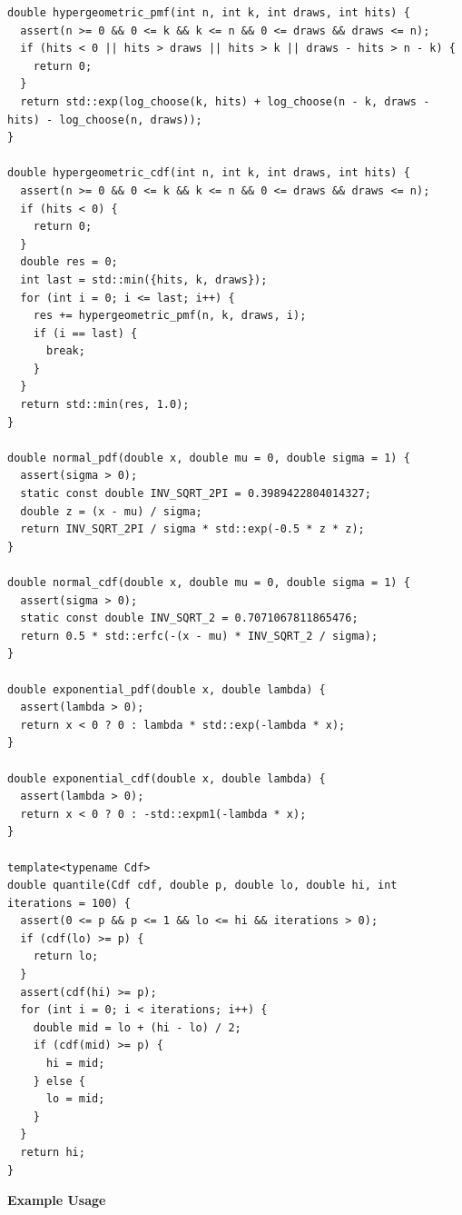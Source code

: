 \begin{lstlisting}[style=cpp]
double hypergeometric_pmf(int n, int k, int draws, int hits) {
  assert(n >= 0 && 0 <= k && k <= n && 0 <= draws && draws <= n);
  if (hits < 0 || hits > draws || hits > k || draws - hits > n - k) {
    return 0;
  }
  return std::exp(log_choose(k, hits) + log_choose(n - k, draws - hits) - log_choose(n, draws));
}

double hypergeometric_cdf(int n, int k, int draws, int hits) {
  assert(n >= 0 && 0 <= k && k <= n && 0 <= draws && draws <= n);
  if (hits < 0) {
    return 0;
  }
  double res = 0;
  int last = std::min({hits, k, draws});
  for (int i = 0; i <= last; i++) {
    res += hypergeometric_pmf(n, k, draws, i);
    if (i == last) {
      break;
    }
  }
  return std::min(res, 1.0);
}

double normal_pdf(double x, double mu = 0, double sigma = 1) {
  assert(sigma > 0);
  static const double INV_SQRT_2PI = 0.3989422804014327;
  double z = (x - mu) / sigma;
  return INV_SQRT_2PI / sigma * std::exp(-0.5 * z * z);
}

double normal_cdf(double x, double mu = 0, double sigma = 1) {
  assert(sigma > 0);
  static const double INV_SQRT_2 = 0.7071067811865476;
  return 0.5 * std::erfc(-(x - mu) * INV_SQRT_2 / sigma);
}

double exponential_pdf(double x, double lambda) {
  assert(lambda > 0);
  return x < 0 ? 0 : lambda * std::exp(-lambda * x);
}

double exponential_cdf(double x, double lambda) {
  assert(lambda > 0);
  return x < 0 ? 0 : -std::expm1(-lambda * x);
}

template<typename Cdf>
double quantile(Cdf cdf, double p, double lo, double hi, int iterations = 100) {
  assert(0 <= p && p <= 1 && lo <= hi && iterations > 0);
  if (cdf(lo) >= p) {
    return lo;
  }
  assert(cdf(hi) >= p);
  for (int i = 0; i < iterations; i++) {
    double mid = lo + (hi - lo) / 2;
    if (cdf(mid) >= p) {
      hi = mid;
    } else {
      lo = mid;
    }
  }
  return hi;
}
\end{lstlisting}
\textbf{Example Usage}\par
